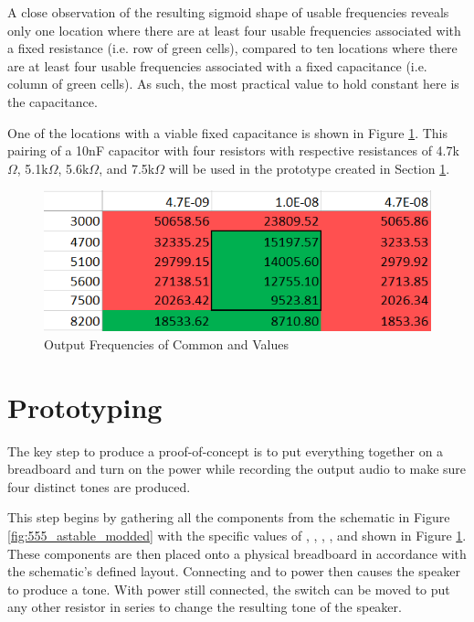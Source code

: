 A close observation of the resulting sigmoid shape of usable
frequencies reveals only one location where there are at least four
usable frequencies associated with a fixed resistance (i.e. row of
green cells), compared to ten locations where there are at least four
usable frequencies associated with a fixed capacitance (i.e. column of
green cells). As such, the most practical value to hold constant here
is the capacitance.

One of the locations with a viable fixed capacitance is shown in Figure
\ref{fig:freq-selection-r}. This pairing of a 10nF capacitor with four
resistors with respective resistances of 4.7k$\Omega$, 5.1k$\Omega$,
5.6k$\Omega$, and 7.5k$\Omega$ will be used in the prototype created in
Section \ref{sec:prototype}.

\begin{figure}[h]
    \centering
    \caption{Output Frequencies of Common  and  Values}
    \label{fig:freq-selection-r}
    \includegraphics[width=0.8\linewidth]{Figures/6 PCB Design/freq_selection_r.png}
\end{figure}


\section{Prototyping}
\label{sec:prototype}

The key step to produce a proof-of-concept is to put everything
together on a breadboard and turn on the power while recording the
output audio to make sure four distinct tones are produced.

This step begins by gathering all the components from the schematic in
Figure \ref{fig:555_astable_modded} with the specific values of
, , , , and  shown in
Figure \ref{fig:freq-selection-r}. These components are then placed
onto a physical breadboard in accordance with the schematic's defined
layout. Connecting  and  to power then causes the
speaker to produce a tone. With power still connected, the switch can
be moved to put any other resistor in series to change the resulting
tone of the speaker.

